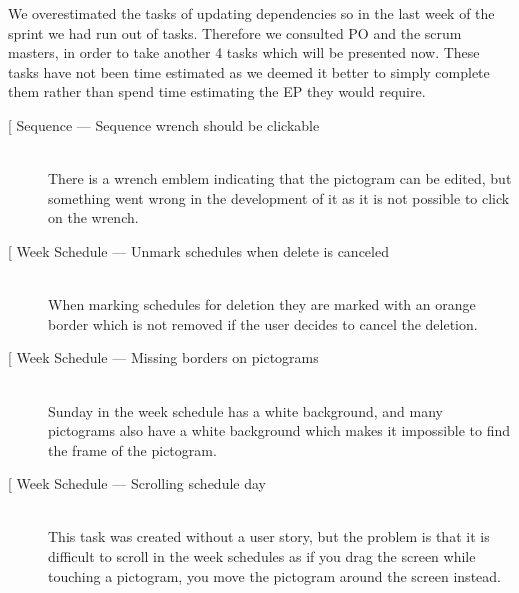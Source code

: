 We overestimated the tasks of updating dependencies so in the last week of the sprint we had run out of tasks.
Therefore we consulted PO and the scrum masters, in order to take another 4 tasks which will be presented now.
These tasks have not been time estimated as we deemed it better to simply complete them rather than spend time estimating the EP they would require.

\begin{description}
    \item[{[}\phigh{]} Sequence --- Sequence wrench should be clickable] \hfill \\
        There is a wrench emblem indicating that the pictogram can be edited, but something went wrong in the development of it as it is not possible to click on the wrench.
    \item[{[}\phigh{]} Week Schedule --- Unmark schedules when delete is canceled] \hfill \\
        When marking schedules for deletion they are marked with an orange border which is not removed if the user decides to cancel the deletion.
    \item[{[}\phigh{]} Week Schedule --- Missing borders on pictograms] \hfill \\
        Sunday in the week schedule has a white background, and many pictograms also have a white background which makes it impossible to find the frame of the pictogram.
    \item[{[}\phigh{]} Week Schedule --- Scrolling schedule day] \hfill\\
        This task was created without a user story, but the problem is that it is difficult to scroll in the week schedules as if you drag the screen while touching a pictogram, you move the pictogram around the screen instead.
\end{description}